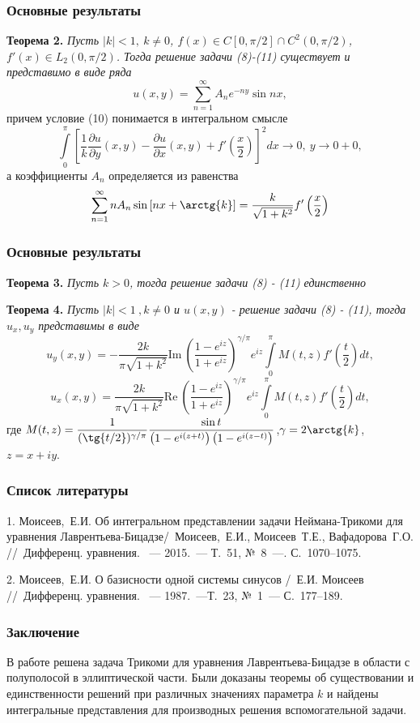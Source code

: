 \documentclass{beamer}
\begin{document}
	\begin{frame}
		\frametitle{Основные результаты}
			\textbf{Теорема 2.} \textit{Пусть $|k| < 1, \ k \neq 0$, $f(x) \in C[0, \pi/2] \cap C^2(0, \pi/2)$, $f'(x) \in L_2(0, \pi/2)$. Тогда решение задачи (8)-(11) существует и представимо в виде ряда
				\begin{equation*}
					u(x,y) = \sum\limits_{n=1}^{\infty} A_n e^{-ny} \sin{nx},
			\end{equation*}}
			причем условие (10) понимается в интегральном смысле
			\[
				\int\limits_0^\pi \left[	\dfrac{1}{k} \dfrac{\partial u}{\partial y}(x,y) - \dfrac{\partial u}{\partial x}(x,y) + f'\left(\dfrac{x}{2}\right)\right]^2 dx \to 0, \ y \to 0 + 0,
			\]
			а коэффициенты $A_n$ определяется из равенства
			\[
				\sum\limits_{n=1}^{\infty} n A_n \sin{\left[nx + \arctg{k}\right]} = \dfrac{k}{\sqrt{1 + k^2}} f'\left(\dfrac{x}{2}\right) 
			\]
	\end{frame}
	
	\begin{frame}
		\frametitle{Основные результаты}
		\textbf{Теорема 3.} \textit{Пусть $k > 0$, тогда решение задачи (8) - (11) единственно}
		
\textbf{Теорема 4.} \textit{Пусть $|k| < 1\  , k \neq 0$ и $u(x,y)$  - решение задачи (8) - (11), тогда $u_x, u_y$ представимы в виде}
\begin{equation*}
	u_y(x,y) = -\dfrac{2k}{\pi\sqrt{1+k^2}} \mathrm{Im}\ \left(\dfrac{1- e^{iz}}{1 + e^{iz}} \right)^{\gamma/\pi} e^{iz}\int\limits_0^\pi M(t,z) f'(\dfrac{t}{2}) dt, 
\end{equation*}
\begin{equation*}
	u_x(x,y) = \dfrac{2k}{\pi\sqrt{1+k^2}} \mathrm{Re}\ \left(\dfrac{1- e^{iz}}{1 + e^{iz}} \right)^{\gamma/\pi} e^{iz}\int\limits_0^\pi M(t,z)  f'(\dfrac{t}{2}) dt,
\end{equation*}
где $M(t,z) = \dfrac{1}{(\tg{t/2})^{\gamma/\pi}}  \dfrac{ \sin{t}}{\left(1 - e^{i(z+t)} \right) \left(1 - e^{i(z-t)}\right)}$,$\gamma = 2\arctg{k}$, $z = x + iy$.
	\end{frame}
	
	
		\begin{frame}
		\frametitle{Список литературы}
			1. Моисеев,~Е.И. Об интегральном представлении задачи Неймана-Трикоми для уравнения Лаврентьева-Бицадзе/~Моисеев,~Е.И., Моисеев~Т.Е., Вафадорова~Г.О. //~Дифференц. уравнения. ~--- 2015.~--- Т.~51, №~8~---. С.~1070--1075.
		
		2. Моисеев,~Е.И.  О базисности одной системы синусов /~Е.И. Моисеев //~Дифференц. уравнения. ~--- 1987.~---Т.~23,  №~1~--- С.~177--189.
	\end{frame}
	
	\begin{frame}
		\frametitle{Заключение}
		В работе решена задача Трикоми для уравнения Лаврентьева-Бицадзе в области с полуполосой в эллиптической части. Были доказаны теоремы об существовании и единственности решений при различных значениях параметра $k$ и найдены интегральные представления для производных решения вспомогательной задачи.
	\end{frame}
	
\end{document}
